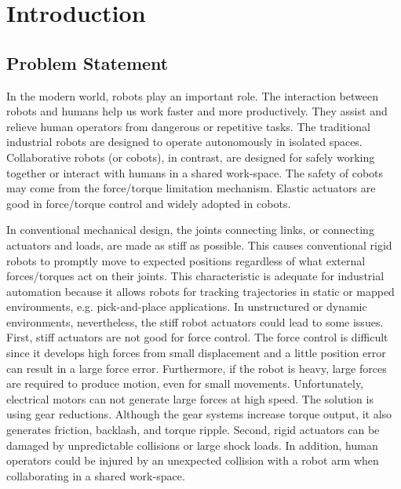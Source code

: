 \documentclass[\main/main.tex]{subfiles}
\begin{document}
\graphicspath{{img/}{01_intro/img/}}

\chapter{Introduction}

\section{Problem Statement}
In the modern world, robots play an important role. The interaction between robots and humans help us work faster and more productively. They assist and relieve human operators from dangerous or repetitive tasks. The traditional industrial robots are designed to operate autonomously in isolated spaces. Collaborative robots (or cobots), in contrast, are designed for safely working together or interact with humans in a shared work-space. The safety of cobots may come from the force/torque limitation mechanism. Elastic actuators are good in force/torque control and widely adopted in cobots.

In conventional mechanical design, the joints connecting links, or connecting actuators and loads, are made as stiff as possible. This causes conventional rigid robots to promptly move to expected positions regardless of what external forces/torques act on their joints. This characteristic is adequate for industrial automation because it allows robots for tracking trajectories in static or mapped environments, e.g. pick-and-place applications. In unstructured or dynamic environments, nevertheless, the stiff robot actuators could lead to some issues. First, stiff actuators are not good for force control. The force control is difficult since it develops high forces from small displacement and a little position error can result in a large force error. Furthermore, if the robot is heavy, large forces are required to produce motion, even for small movements. Unfortunately, electrical motors can not generate large forces at high speed. The solution is using gear reductions. Although the gear systems increase torque output, it also generates friction, backlash, and torque ripple. Second, rigid actuators can be damaged by unpredictable collisions or large shock loads. In addition, human operators could be injured by an unexpected collision with a robot arm when collaborating in a shared work-space.
\end{document}

